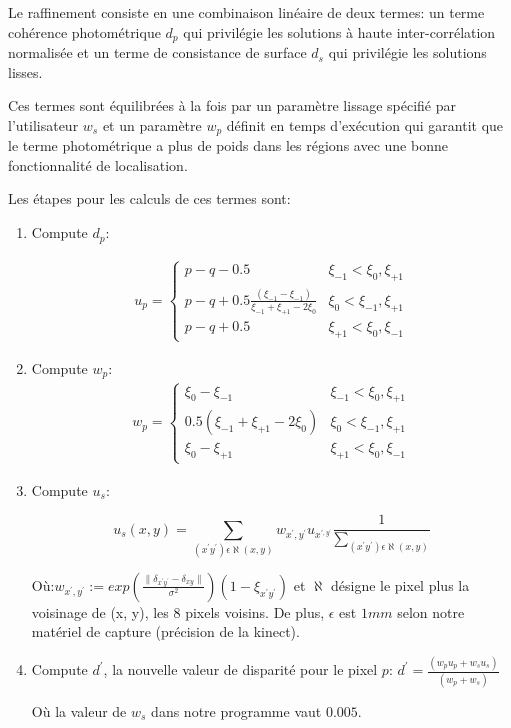 \documentclass[a4paper,12pt]{article}
\begin{document}
Le raffinement consiste en une combinaison linéaire de deux termes: un
terme cohérence photométrique $d_p$ qui privilégie les solutions à
haute inter-corrélation normalisée et un terme de consistance de
surface $d_s$ qui privilégie les solutions lisses.

Ces termes sont équilibrées à la fois par un paramètre lissage
spécifié par l'utilisateur $w_s$ et un paramètre $w_p$ définit en temps
d'exécution qui garantit que le terme photométrique a plus de poids
dans les régions avec une bonne fonctionnalité de localisation.

Les étapes pour les calculs de ces termes sont:
\begin{enumerate}
\item Compute $d_p$:

\begin{eqnarray*}
u_{p}=\begin{cases}
p - q - 0.5 & \xi_{-1}<\xi_{0},\xi_{+1}\\
p - q + 0.5\frac{(\xi_{-1}-\xi_{-1})}{\xi_{-1}+\xi_{+1}-2\xi_{0}} &
\xi_{0}<\xi_{-1},\xi_{+1}\\ 
p - q + 0.5 & \xi_{+1}<\xi_{0},\xi_{-1}
\end{cases}
\end{eqnarray*}

\item Compute $w_p$:
\begin{eqnarray*}
w_{p}=\begin{cases}
\xi_{0}-\xi_{-1} & \xi_{-1}<\xi_{0},\xi_{+1}\\
0.5(\xi_{-1}+\xi_{+1}-2\xi_{0}) & \xi_{0}<\xi_{-1},\xi_{+1}\\
\xi_{0}-\xi_{+1} & \xi_{+1}<\xi_{0},\xi_{-1}
\end{cases}
\end{eqnarray*}

\item Compute $u_s$:

\[
u_{s}(x,y)=\sum_{(x^{'}y^{'})\epsilon\aleph(x,y)}w_{x^{'},y^{'}}u_{x^{',y^{'}}}\frac{1}{\sum_{(x^{'}y^{'})\epsilon\aleph(x,y)}} 
\]

Où:$w_{x^{'},y^{'}}:=exp\left(\frac{\parallel\delta_{x^{'}y^{'}}-\delta_{xy}\parallel}{\sigma^{2}}\right)(1-\xi_{x^{'}y^{'}})$
et $\aleph$ désigne le pixel plus la voisinage de (x, y), les 8 pixels
voisins. De plus, $\epsilon$ est $1mm$ selon notre matériel de capture
(précision de la kinect). 

\item Compute $d^{'}$, la nouvelle valeur de disparité pour le pixel $p$:
$d^{'}=\frac{(w_{p}u_{p}+w_{s}u_{s})}{(w_{p}+w_{s})}$

Où la valeur de $w_{s}$ dans notre programme vaut $0.005$.

\end{enumerate}
\end{document}
